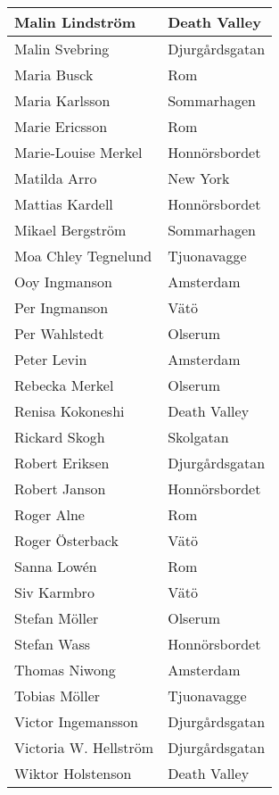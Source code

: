 \documentclass[12.0pt]{extarticle}
\begin{document}
\begin{center}
\begin{tabular}{l l}
Malin Lindström	&	Death Valley	\\ \hline
Malin Svebring	&	Djurgårdsgatan	\\ \hline
Maria Busck	&	Rom	\\ \hline
Maria Karlsson	&	Sommarhagen	\\ \hline
Marie Ericsson	&	Rom	\\ \hline
Marie-Louise Merkel	&	Honnörsbordet	\\ \hline
Matilda Arro	&	New York	\\ \hline
Mattias Kardell	&	Honnörsbordet	\\ \hline
Mikael Bergström	&	Sommarhagen	\\ \hline
Moa Chley Tegnelund	&	Tjuonavagge	\\ \hline
Ooy Ingmanson	&	Amsterdam	\\ \hline
Per Ingmanson	&	Vätö	\\ \hline
Per Wahlstedt	&	Olserum	\\ \hline
Peter Levin	&	Amsterdam	\\ \hline
Rebecka Merkel	&	Olserum	\\ \hline
Renisa Kokoneshi	&	Death Valley	\\ \hline
Rickard Skogh	&	Skolgatan	\\ \hline
Robert Eriksen	&	Djurgårdsgatan	\\ \hline
Robert Janson	&	Honnörsbordet	\\ \hline
Roger Alne	&	Rom	\\ \hline
Roger Österback	&	Vätö	\\ \hline
Sanna Lowén	&	Rom	\\ \hline
Siv Karmbro	&	Vätö	\\ \hline
Stefan Möller	&	Olserum	\\ \hline
Stefan Wass	&	Honnörsbordet	\\ \hline
Thomas Niwong	&	Amsterdam	\\ \hline
Tobias Möller	&	Tjuonavagge	\\ \hline
Victor Ingemansson	&	Djurgårdsgatan	\\ \hline
Victoria W. Hellström	&	Djurgårdsgatan	\\ \hline
Wiktor Holstenson	&	Death Valley	\\ \hline
\end{tabular}

\end{center}

		
	
\end{document}
